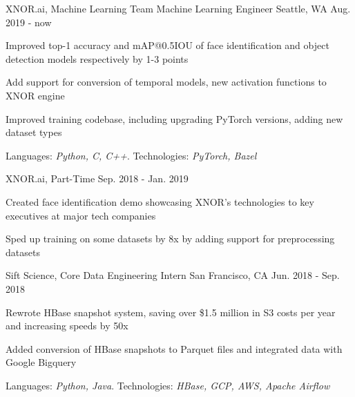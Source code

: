 \begin{cventries}
    \vspace{-0.6em}
  \cventry
    {XNOR.ai, Machine Learning Team}
    {Machine Learning Engineer}
    {Seattle, WA}
    {Aug. 2019 - now}
    {
      \begin{cvitems}
	\item {Improved top-1 accuracy and mAP@0.5IOU of face identification and object detection models respectively by 1-3 points}
	\item {Add support for conversion of temporal models, new activation functions to XNOR engine}
        \item {Improved training codebase, including upgrading PyTorch versions, adding new dataset types} 
        \item {Languages: \textit{Python, C, C++}. Technologies: \textit{PyTorch, Bazel}}
	\vspace{-1em}
      \end{cvitems}
    }
  \cventry
    {XNOR.ai, Part-Time}
    {}
    {}
    {Sep. 2018 - Jan. 2019}
    {
      \begin{cvitems}
	\item {Created face identification demo showcasing XNOR's technologies to key executives at major tech companies} 
	\item {Sped up training on some datasets by 8x by adding support for preprocessing datasets}
      \end{cvitems}
    }


    \vspace{-1.2em}
  \cventry
    {Sift Science, Core Data}
    {Engineering Intern}
    {San Francisco, CA}
    {Jun. 2018 - Sep. 2018}
    {
      \begin{cvitems}
        \item {Rewrote HBase snapshot system, saving over \$1.5 million in S3 costs per year and increasing speeds by 50x}
        \item {Added conversion of HBase snapshots to Parquet files and integrated data with Google Bigquery}
        \item {Languages: \textit{Python, Java}. Technologies: \textit{HBase, GCP, AWS, Apache Airflow}}
      \end{cvitems}
    }

\begin{comment}
    \vspace{-0.6em}
  \cventry
    {Mode Lab, University of Washington CSE}
    {Undergraduate Research Assistant}
    {Seattle, WA}
    {Mar. 2018 - Sep. 2018}
    {
      \begin{cvitems}
        \item {Studying the application of linear dynamical systems (LDS) on creating sparse models for MEG data.}
        \item {Implemented stochastic gradient descent for inference of LDS using \textit{Python, numpy, Autograd, einsum2}}
      \end{cvitems}
    }
\end{comment}


\end{cventries}
